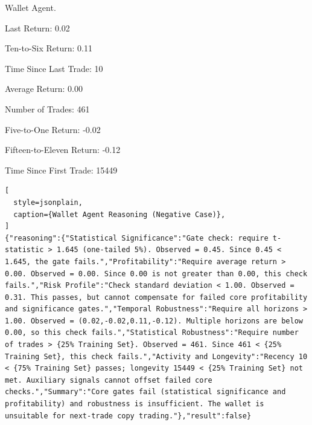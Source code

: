 \begin{reasoning}[label={cot:wallet_agent}]{Wallet Agent.}
\begin{minipage}[t]{0.49\linewidth}
Last Return: 0.02

Ten-to-Six Return: 0.11

Time Since Last Trade: 10

\end{minipage}
\hfill
\begin{minipage}[t]{0.50\linewidth}
Average Return: 0.00

Number of Trades: 461

Five-to-One Return: -0.02

Fifteen-to-Eleven Return: -0.12

Time Since First Trade: 15449
\end{minipage}
\begin{lstlisting}[
  style=jsonplain,
  caption={Wallet Agent Reasoning (Negative Case)},
]
{"reasoning":{"Statistical Significance":"Gate check: require t-statistic > 1.645 (one-tailed 5%). Observed = 0.45. Since 0.45 < 1.645, the gate fails.","Profitability":"Require average return > 0.00. Observed = 0.00. Since 0.00 is not greater than 0.00, this check fails.","Risk Profile":"Check standard deviation < 1.00. Observed = 0.31. This passes, but cannot compensate for failed core profitability and significance gates.","Temporal Robustness":"Require all horizons > 1.00. Observed = (0.02,-0.02,0.11,-0.12). Multiple horizons are below 0.00, so this check fails.","Statistical Robustness":"Require number of trades > {25% Training Set}. Observed = 461. Since 461 < {25% Training Set}, this check fails.","Activity and Longevity":"Recency 10 < {75% Training Set} passes; longevity 15449 < {25% Training Set} not met. Auxiliary signals cannot offset failed core checks.","Summary":"Core gates fail (statistical significance and profitability) and robustness is insufficient. The wallet is unsuitable for next-trade copy trading."},"result":false}
\end{lstlisting}
\end{reasoning}